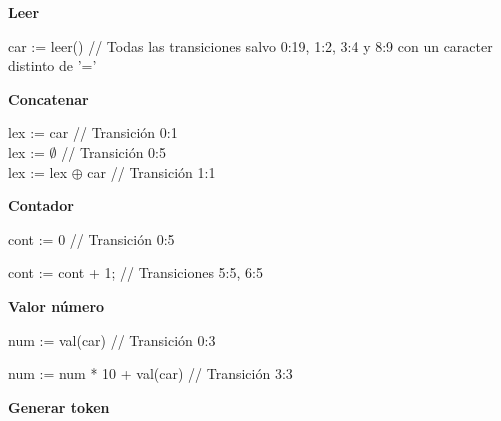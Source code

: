 \documentclass{article}
\begin{document}
\vspace{0.3cm}

\textbf{Leer}

    car := leer() \hspace{3.5cm}	// Todas las transiciones salvo 0:19, 1:2, 3:4 y 8:9 con un caracter distinto de '='

\vspace{0.3cm}

\textbf{Concatenar}

    lex := car  \hspace{4cm}	// Transición 0:1\\
	lex := $\emptyset$ \hspace{4.5cm}		// Transición 0:5\\
    lex := lex $\oplus$  car \hspace{3cm}	// Transición 1:1


\vspace{0.3cm}

\textbf{Contador }

    cont := 0 \hspace{4cm} // Transición 0:5 
    
    cont := cont + 1; \hspace{2.7cm}	// Transiciones 5:5, 6:5 


\vspace{0.3cm}

\textbf{Valor número}
 
    num := val(car) \hspace{2.9cm} 	// Transición 0:3
    
    num := num * 10 + val(car) \hspace{0.9cm} 	// Transición 3:3


\vspace{0.3cm}

\textbf{Generar token}
\end{document}
